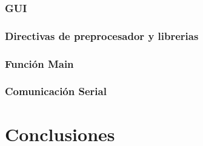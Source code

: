   \subsubsection{GUI}
  \subsubsection{Directivas de preprocesador y librerias}
  \subsubsection{Función Main}
  
  \subsubsection{Comunicación Serial}
  \section{Conclusiones}

  \nocite{atmega328Datasheet}
  \nocite{bjarneC++}
  \nocite{deitel}
  \nocite{make}
  \nocite{CProgramingMicro}
  \nocite{ControlPerifericosPaina}
  {}
  


